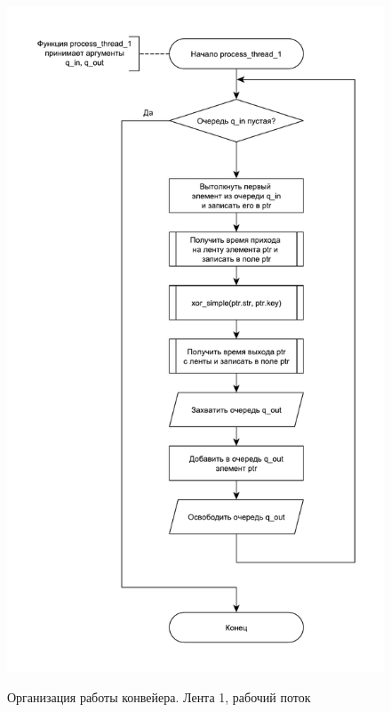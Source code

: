 \begin{figure}[pt!]
	\begin{center}
		{\includegraphics[scale = 0.55]{schemes/line_1}}
		\caption{Организация работы конвейера. Лента 1, рабочий поток}
		\label{fig5:image}
	\end{center}
\end{figure}

